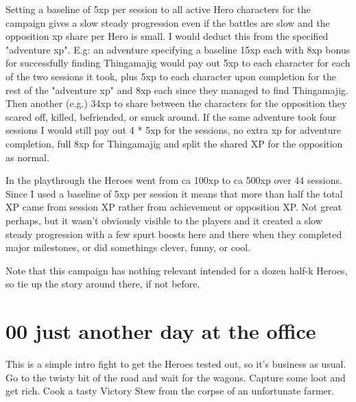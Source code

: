 Setting a baseline of 5xp per session to all active Hero characters for the campaign gives a slow steady progression even if the battles are slow and the opposition xp share per Hero is small. I would deduct this from the specified "adventure xp". E.g: an adventure specifying a baseline 15xp each with 8xp bonus for successfully finding Thingamajig would pay out 5xp to each character for each of the two sessions it took, plus 5xp to each character upon completion for the rest of the "adventure xp" and 8xp each since they managed to find Thingamajig. Then another (e.g.) 34xp to share between the characters for the opposition they scared off, killed, befriended, or snuck around. If the same adventure took four sessions I would still pay out 4 * 5xp for the sessions, no extra xp for adventure completion, full 8xp for Thingamajig and split the shared XP for the opposition as normal.

In the playthrough the Heroes went from ca 100xp to ca 500xp over 44 sessions. Since I used a baseline of 5xp per session it means that more than half the total XP came from session XP rather from achievement or opposition XP. Not great perhaps, but it wasn't obviously visible to the players and it created a slow steady progression with a few spurt boosts here and there when they completed major milestones, or did somethings clever, funny, or cool.

Note that this campaign has nothing relevant intended for a dozen half-k Heroes, so tie up the story around there, if not before. 








\clearpage
\section*{00 just another day at the office}
\label{00justanotherdayattheoffice}

This is a simple intro fight to get the Heroes tested out, so it's business as usual. Go to the twisty bit of the road and wait for the wagons. Capture some loot and get rich. Cook a tasty Victory Stew from the corpse of an unfortunate farmer.


